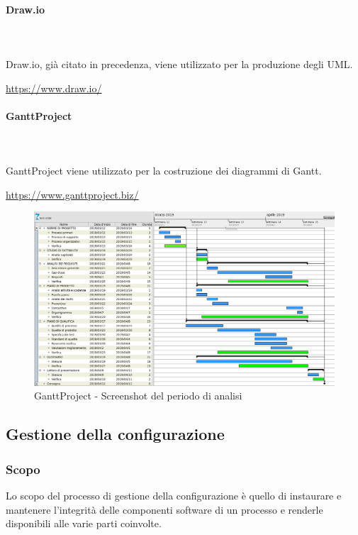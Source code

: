 		\paragraph{Draw.io} \mbox{}\\ \mbox{}\\
		Draw.io, già citato in precedenza, viene utilizzato per la produzione degli UML\glo. \newline
		\centerline{\url{https://www.draw.io/}}
		
		\paragraph{GanttProject} \mbox{}\\ \mbox{}\\
		GanttProject viene utilizzato per la costruzione dei diagrammi				di Gantt\glo. \newline
		\centerline{\url{https://www.ganttproject.biz/}}
		\begin{figure}[H]
			\includegraphics[width=0.99\linewidth]{res/images/ganttproj.png}
			\caption{GanttProject - Screenshot del periodo di analisi}
		\end{figure} 
		
	\subsection{Gestione della configurazione}
	\subsubsection{Scopo}
	Lo scopo del processo di gestione della configurazione è quello di instaurare e mantenere l'integrità delle componenti software di un processo e renderle disponibili alle varie parti coinvolte.

